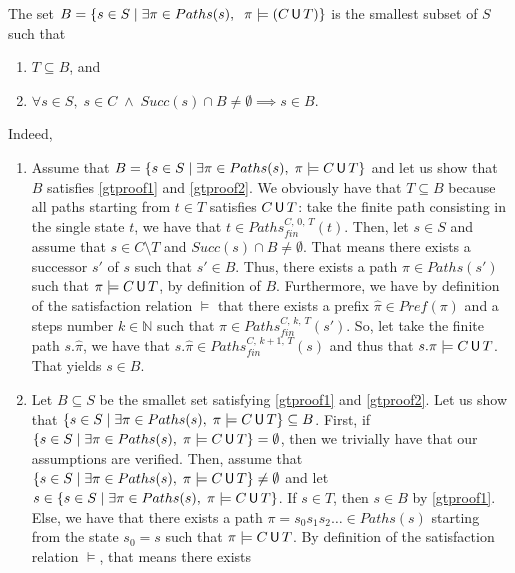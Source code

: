 \begin{proof2}
The set $B = \{ s \in S \; | \; \exists \pi \in Paths(s), \;\; \pi \models (C \,\text{\sffamily U}\, T) \}$ is the smallest subset of $S$ such that
\begin{enumerate}[(a.)]
  \item $T \subseteq B$, and \label{gtproof1}
  \item $\forall s \in S, \; s \in C \; \wedge \; Succ(s) \cap B \neq \emptyset \implies s \in B$. \label{gtproof2}
\end{enumerate}
Indeed,
\begin{enumerate}
  \item Assume that $B = \{s \in S \; | \; \exists \pi \in Paths(s), \; \pi \models C\,\text{\sffamily U}\, T\}$ and let us show that $B$ satisfies \ref{gtproof1} and \ref{gtproof2}. We obviously have that $T \subseteq B$ because all paths starting from $t \in T$ satisfies $C \,\text{\sffamily U}\, T$: take the finite path consisting in the single state $t$, we have that
  $t \in Paths_{fin}^{C, \, 0,\, T}(t)$.
  Then, let $s \in S$ and assume that $s \in C \setminus T$ and $Succ(s) \cap B \neq \emptyset$. That means there exists a successor $s'$ of $s$ such that $s' \in B$. Thus, there exists
  a path $\pi \in Paths(s')$ such that $\pi \models C\,\text{\sffamily U}\, T$, by definition of $B$. Furthermore, we have by definition of the satisfaction relation $\models$ that there exists a prefix $\hat{\pi}\in Pref(\pi)$ and a steps number $k \in \mathbb{N}$ such that $\hat{\pi} \in Paths_{fin}^{C, \, k,\, T}(s')$. So, let take the finite path $s.\hat{\pi}$, we have that $s.\hat{\pi} \in Paths^{C, \, k+1, \, T}_{fin}(s)$
  and thus that $s.\pi \models C \,\text{\sffamily U}\, T$. That yields $s \in B$.
  \item Let $B \subseteq S$ be the smallet set satisfying \ref{gtproof1} and \ref{gtproof2}.
  Let us show that $\{s \in S \; | \; \exists \pi \in Paths(s), \; \pi \models C\,\text{\sffamily U}\, T\} \subseteq B$.
  First, if $\{s \in S \; | \; \exists \pi \in Paths(s), \; \pi \models C \,\text{\sffamily U}\, T\} = \emptyset$,
  then we trivially have that our assumptions are verified. Then, assume that $\{s\in S \; | \; \exists \pi \in Paths(s), \; \pi \models C \,\text{\sffamily U}\, T\} \neq \emptyset$ and let $s \in \{s\in S \; | \; \exists \pi \in Paths(s), \; \pi \models C \,\text{\sffamily U}\, T\}$. If $s \in T$, then $s \in B$ by \ref{gtproof1}.
  Else, we have that there exists a path $\pi = s_0 s_1 s_2 \dots \in Paths(s)$ starting from the state $s_0=s$ such that  $\pi \models C \,\text{\sffamily U}\, T$.
  By definition of the satisfaction relation $\models$, that means there exists

\end{enumerate}
\end{proof2}
